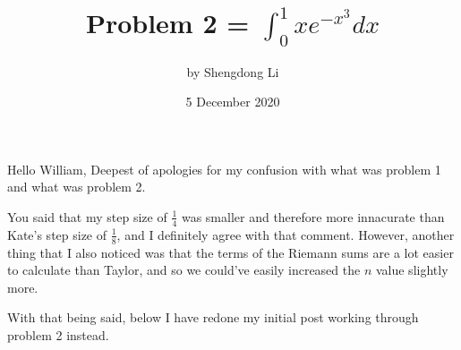 \documentclass[12pt]{article}
\begin{document}
\title{Problem 2 = $\int_{0}^{1}xe^{-x^{3}}dx$}
\author{by Shengdong Li}
\date{5 December 2020}
\maketitle

Hello William, 
Deepest of apologies for my confusion with what was problem 1 and what was problem 2. 

You said that my step size of $\frac{1}{4}$ was smaller and therefore more innacurate than Kate's step size of $\frac{1}{8}$, and I definitely agree with that comment. However, another thing that I also noticed was that the terms of the Riemann sums are a lot easier to calculate than Taylor, and so we could've easily increased the $n$ value slightly more. 

With that being said, below I have redone my initial post working through problem 2 instead.
\end{document}
